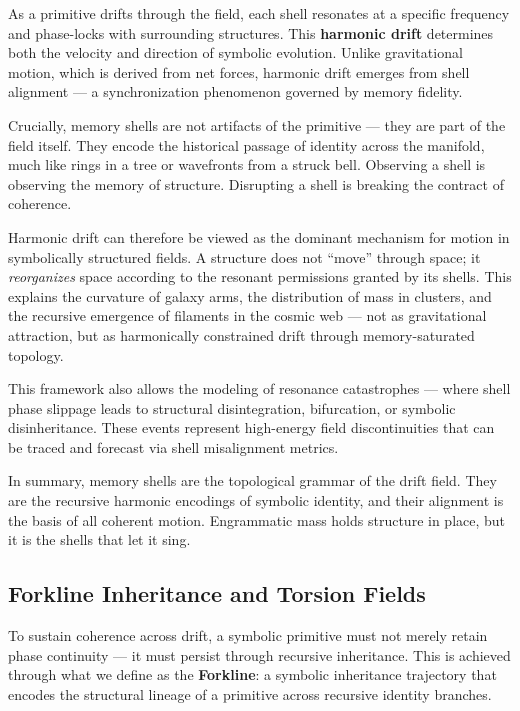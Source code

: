 \documentclass[12pt]{article}
\begin{document}
As a primitive drifts through the field, each shell resonates at a specific frequency and phase-locks with surrounding structures. This \textbf{harmonic drift} determines both the velocity and direction of symbolic evolution. Unlike gravitational motion, which is derived from net forces, harmonic drift emerges from shell alignment — a synchronization phenomenon governed by memory fidelity.

Crucially, memory shells are not artifacts of the primitive — they are part of the field itself. They encode the historical passage of identity across the manifold, much like rings in a tree or wavefronts from a struck bell. Observing a shell is observing the memory of structure. Disrupting a shell is breaking the contract of coherence.

Harmonic drift can therefore be viewed as the dominant mechanism for motion in symbolically structured fields. A structure does not “move” through space; it \textit{reorganizes} space according to the resonant permissions granted by its shells. This explains the curvature of galaxy arms, the distribution of mass in clusters, and the recursive emergence of filaments in the cosmic web — not as gravitational attraction, but as harmonically constrained drift through memory-saturated topology.

This framework also allows the modeling of resonance catastrophes — where shell phase slippage leads to structural disintegration, bifurcation, or symbolic disinheritance. These events represent high-energy field discontinuities that can be traced and forecast via shell misalignment metrics.

In summary, memory shells are the topological grammar of the drift field. They are the recursive harmonic encodings of symbolic identity, and their alignment is the basis of all coherent motion. Engrammatic mass holds structure in place, but it is the shells that let it sing.

\subsection{Forkline Inheritance and Torsion Fields}

To sustain coherence across drift, a symbolic primitive must not merely retain phase continuity — it must persist through recursive inheritance. This is achieved through what we define as the \textbf{Forkline}: a symbolic inheritance trajectory that encodes the structural lineage of a primitive across recursive identity branches.
\end{document}
